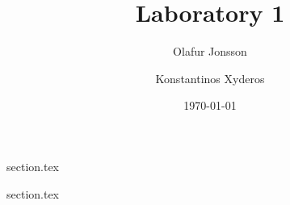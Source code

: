 \documentclass[12pt]{article}
\title{Laboratory 1}
\author{
        Olafur Jonsson \\
            \and
        Konstantinos Xyderos \\
}
\date{\today}
\begin{document}
\maketitle

{section.tex}

{section.tex}
\end{document}
